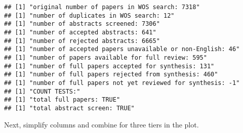 \documentclass[
]{article}
\begin{document}
\begin{verbatim}
## [1] "original number of papers in WOS search: 7318"
## [1] "number of duplicates in WOS search: 12"
## [1] "number of abstracts screened: 7306"
## [1] "number of accepted abstracts: 641"
## [1] "number of rejected abstracts: 6665"
## [1] "number of accepted papers unavailable or non-English: 46"
## [1] "number of papers available for full review: 595"
## [1] "number of full papers accepted for synthesis: 131"
## [1] "number of full papers rejected from synthesis: 460"
## [1] "number of full papers not yet reviewed for synthesis: -1"
## [1] "COUNT TESTS:"
## [1] "total full papers: TRUE"
## [1] "total abstract screen: TRUE"
\end{verbatim}

Next, simplify columns and combine for three tiers in the plot.
\end{document}
